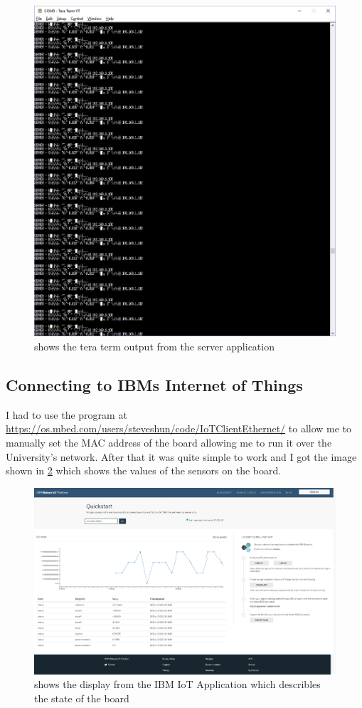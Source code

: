 \documentclass[a4paper,12pt]{scrartcl}
\begin{document}
{{{\begin{figure}
					\centering
					\includegraphics[width=\textwidth]{ServerAcceleratorData}
					\caption{shows the tera term output from the server application}
					\label{img:ex2-server}
				\end{figure}
			}
		}
		\subsection{Connecting to IBMs Internet of Things}
		{
			I had to use the program at \url{https://os.mbed.com/users/steveshun/code/IoTClientEthernet/} to allow me to manually set the MAC address of the board allowing me to run it over the University's network. After that it was quite simple to work and I got the image shown in \cref{img:IBMIoT} which shows the values of the sensors on the board. 
			\begin{figure}
				\centering
				\includegraphics[width=\textwidth]{IBMIoT}
				\caption{shows the display from the IBM IoT Application which describles the state of the board}
				\label{img:IBMIoT}
			\end{figure}
		}
	}
\end{document}
